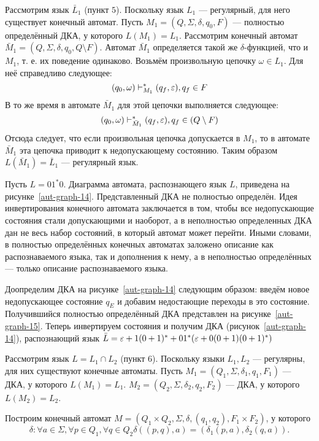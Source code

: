 Рассмотрим язык $\bar L_1$ (пункт $5$). Поскольку язык $L_1$ --- регулярный, для него существует конечный автомат. Пусть $M_1 = (Q,\Sigma, \delta, q_0, F)$ --- полностью определённый ДКА, у которого $L(M_1) = L_1$. Рассмотрим конечный автомат $\bar M_1 = (Q,\Sigma, \delta, q_0, Q \setminus F)$. Автомат $\bar M_1$ определяется такой же $\delta$-функцией, что и $M_1$, т. е. их поведение одинаково. Возьмём произвольную цепочку $\omega \in L_1$. Для неё справедливо следующее:
\[ (q_0, \omega) \vdash_{M_1}^* (q_f, \varepsilon), q_f \in F \]
В то же время в автомате $\bar M_1$ для этой цепочки выполняется следующее:
\[ (q_0, \omega) \vdash_{\bar M_1}^* (q_f, \varepsilon), q_f \in (Q \setminus F) \]
Отсюда следует, что если произвольная цепочка допускается в $M_1$, то в автомате $\bar M_1$ эта цепочка приводит к недопускающему состоянию. Таким образом $L(\bar M_1) = \bar L_1$ --- регулярный язык.

\begin{myexample}
Пусть $L = 01^*0$. Диаграмма автомата, распознающего язык $L$, приведена на рисунке~\ref{aut-graph-14}. Представленный ДКА не полностью определён. Идея инвертирования конечного автомата заключается в том, чтобы все недопускающие состояния стали допускающими и наоборот, а в неполностью определенных ДКА дан не весь набор состояний, в который автомат может перейти. Иными словами, в полностью определённых конечных автоматах заложено описание как распознаваемого языка, так и дополнения к нему, а в неполностью определённых --- только описание распознаваемого языка.

Доопределим ДКА на рисунке~\ref{aut-graph-14} следующим образом: введём новое недопускающее состояние $q_E$ и добавим недостающие переходы в это состояние. Получившийся полностью определённый ДКА представлен на рисунке~\ref{aut-graph-15}. Теперь инвертируем состояния и получим ДКА (рисунок~\ref{aut-graph-14}), распознающий язык $\bar L = \varepsilon + 1(0 + 1)^* + 01^*(\varepsilon + 0(0+1)(0+1)^*)$
\end{myexample}



Рассмотрим язык $L = L_1 \cap L_2$ (пункт $6$). Поскольку языки $L_1, L_2$ --- регулярны, для них существуют конечные автоматы. Пусть $M_1 = (Q_1,\Sigma, \delta_1, q_1, F_1)$ --- ДКА, у которого $L(M_1) = L_1$. $M_2 = (Q_2,\Sigma, \delta_2, q_2, F_2)$ --- ДКА, у которого $L(M_2) = L_2$.

Построим конечный автомат $M = (Q_1 \times Q_2,\Sigma, \delta, (q_1, q_2), F_1 \times F_2)$, у которого
\[ \delta: \forall a \in \Sigma, \forall p \in Q_1, \forall q \in Q_2 \delta((p, q), a) = (\delta_1(p,a), \delta_2(q,a)). \]

